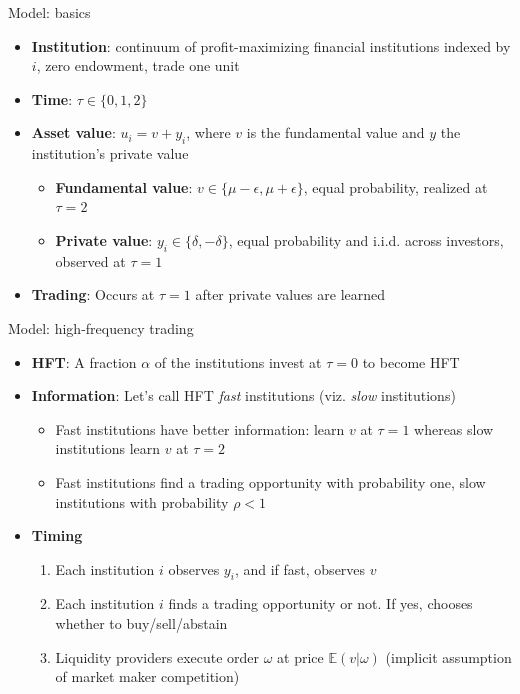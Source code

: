 \documentclass[english,10pt
,aspectratio=169
]{beamer}
\begin{document}
\begin{frame}{Model: basics}
	\begin{itemize}
		\item \textbf{Institution}: continuum of profit-maximizing financial institutions indexed by $i$, zero endowment, trade one unit 
		\item \textbf{Time}: $\tau \in \{0,1,2\}$
		\item \textbf{Asset value}: $u_{i}=v+y_{i}$, where $v$ is the fundamental value and $y$ the institution's private value 
		\begin{itemize}
			\item \textbf{Fundamental value}: $v \in \{\mu-\epsilon, \mu + \epsilon\}$, equal probability, realized at $\tau=2$
			\item \textbf{Private value}: $y_{i} \in \{\delta, -\delta\}$, equal probability and i.i.d. across investors, observed at $\tau=1$ 
		\end{itemize}
		\item \textbf{Trading}: Occurs at $\tau=1$ after private values are learned
	\end{itemize}
\end{frame}


\begin{frame}{Model: high-frequency trading}
	\begin{itemize}
		\item \textbf{HFT}: A fraction $\alpha$ of the institutions invest at $\tau =0$ to become HFT
		\item \textbf{Information}: Let's call HFT \textit{fast} institutions (viz. \textit{slow} institutions)
		\begin{itemize}
			\item Fast institutions have better information: learn $v$ at $\tau=1$ whereas slow institutions learn $v$ at $\tau=2$
			\item Fast institutions find a trading opportunity with probability one, slow institutions with probability $\rho<1$
		\end{itemize}
		\item \textbf{Timing}
		\begin{enumerate}
			\item Each institution $i$ observes $y_{i}$, and if fast, observes $v$
			\item Each institution $i$ finds a trading opportunity or not. If yes, chooses whether to buy/sell/abstain
			\item Liquidity providers execute order $\omega$ at price $\mathbb{E}(v|\omega)$
			(implicit assumption of market maker competition)
		\end{enumerate}
	\end{itemize}
\end{frame}
\end{document}
